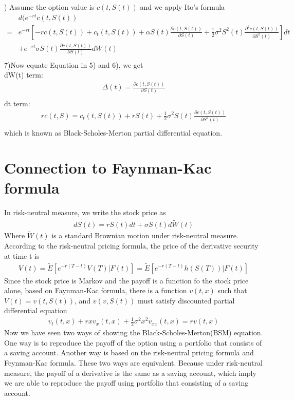 \documentclass[a4paper]{article}
\begin{document}
) Assume the option value is $c(t,S(t))$ and we apply Ito's formula\\
\begin{align*}
	& d(e^{-rt } c(t, S(t)) \\
= & e^{-rt} [- r c(t, S(t)) + c_t(t, S(t)) + \alpha S(t) \frac{\partial c(t, S(t))}{\partial S(t)}  +\frac{1}{2} \sigma^2 S^2(t) \frac{\partial^2 c(t, S(t))}{\partial S^2(t)} ] dt\\
  & +e^{-rt} \sigma S(t)  \frac{\partial c(t, S(t))}{\partial S(t)} dW(t)\\
\end{align*}
7)\noindent	Now equate Equation in 5) and 6), we get\\
dW(t) term:
\begin{align*}
	\Delta(t) = \frac{\partial c(t,S(t))}{\partial S(t)} \\	
\end{align*}
dt term:
\begin{align*}
	rc(t, S)  = c_t (t, S(t)) + r S(t) + \frac{1}{2} \sigma^2 S(t) \frac{\partial c(t, S(t))}{\partial S^2(t)}  \\
\end{align*}
which is known as Black-Scholes-Merton partial differential equation.
\section{Connection to Faynman-Kac formula}
In risk-neutral measure, we write the stock price as
\begin{align*}
	dS(t) = rS(t) dt + \sigma S(t) d \tilde W(t) 
\end{align*}
Where $\tilde W(t)$ is a standard Brownian motion under risk-neutral measure.\\
According to the risk-neutral pricing formula, the price of the derivative security at time t is
\begin{align*}
	V(t) = \tilde E[e^{-r(T-t)}V(T)| F(t)] = \tilde E[e^{-r(T-t)}h(S(T))| F(t)]
\end{align*}
Since the stock price is Markov and the payoff is a function fo the stock price alone, based on Faynman-Kac formula, there is a function $v(t,x)$ such that $V(t) = v(t, S(t))$, and $v(v, S(t))$ must satisfy discounted partial differential equation 
\begin{align*}
	v_t(t,x) + rx v_x(t,x) + \frac{1}{2} \sigma^2 x^2 v_{xx}(t,x) = rv(t,x)
\end{align*}
Now we have seen two ways of showing the Black-Scholes-Merton(BSM) equation. 
One way is to reproduce the payoff of the option using a portfolio that consists of a 
saving account. Another way is based on the risk-neutral pricing formula and Feynman-Kac formula. 
These two ways are equivalent. Because under risk-neutral measure, the payoff of a derivative is the same as a saving account, which imply we are able to reproduce the payoff using portfolio that consisting of a saving account.
\end{document}
